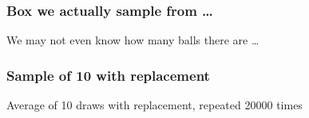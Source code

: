 \documentclass[handout]{beamer}
\begin{document}


   \begin{frame}
   \frametitle{Box we actually sample from \dots}
   \begin{center}
   \end{center}
   We may not even know how many balls there are \dots
   \end{frame}



   \begin{frame}
   \frametitle{Sample of 10 with replacement}
   \begin{center}
   \end{center}
   Average of 10 draws with replacement, repeated 20000 times
   \end{frame}
\end{document}
